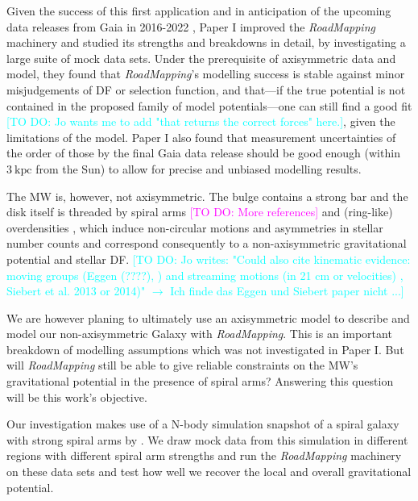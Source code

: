 \documentclass[iop,revtex4,numberedappendix,appendixfloats]{emulateapj}
\newcommand{\RM}{{\sl RoadMapping}}
\newcommand{\Wilma}[1]{\textcolor{Magenta}{#1}}
\newcommand{\Jo}[1]{\textcolor{Cyan}{#1}}
\begin{document}
Given the success of this first application and in anticipation of the upcoming data releases from Gaia in 2016-2022 \citep{2013CEAB...37..115E}, Paper I improved the \RM{} machinery and studied its strengths and breakdowns in detail, by investigating a large suite of mock data sets. Under the prerequisite of axisymmetric data and model, they found that \RM{}'s modelling success is stable against minor misjudgements of DF or selection function, and that---if the true potential is not contained in the proposed family of model potentials---one can still find a good fit \Jo{[TO DO: Jo wants me to add "that returns the correct forces" here.]}, given the limitations of the model. Paper I also found that measurement uncertainties of the order of those by the final Gaia data release should be good enough (within $3~\text{kpc}$ from the Sun) to allow for precise and unbiased modelling results. 

The MW is, however, not axisymmetric. The bulge contains a strong bar \citep{1980ApJ...236..779L,1991ApJ...379..631B,2000MNRAS.317L..45H,2013MNRAS.435.1874W} and the disk itself is threaded by spiral arms \citep{1958MNRAS.118..379O,1976A&A....49...57G,2009PASP..121..213C,2014ApJ...783..130R} \Wilma{[TO DO: More references]} and (ring-like) overdensities \citep{2002ApJ...569..245N,2008ApJ...673..864J,2015ApJ...801..105X}, which induce non-circular motions and asymmetries in stellar number counts and correspond consequently to a non-axisymmetric gravitational potential and stellar DF. \Jo{[TO DO: Jo writes: "Could also cite kinematic evidence: moving groups (Eggen (????), \citet{1998AJ....115.2384D,2005A&A...430..165F,2009ApJ...700.1794B,2010ApJ...717..617B}) and streaming motions (in 21 cm or velocities) \citep{2015ApJ...800...83B,2013MNRAS.436..101W}, Siebert et al. 2013 or 2014)" $\longrightarrow$ Ich finde das Eggen und Siebert paper nicht ...]}

We are however planing to ultimately use an axisymmetric model to describe and model our non-axisymmetric Galaxy with \RM{}. This is an important breakdown of modelling assumptions which was not investigated in Paper I. But will \RM{} still be able to give reliable constraints on the MW's gravitational potential in the presence of spiral arms? Answering this question will be this work's objective.

Our investigation makes use of a N-body simulation snapshot of a spiral galaxy with strong spiral arms by \citet{2013ApJ...766...34D}. We draw mock data from this simulation in different regions with different spiral arm strengths and run the \RM{} machinery on these data sets and test how well we recover the local and overall gravitational potential.
\end{document}
